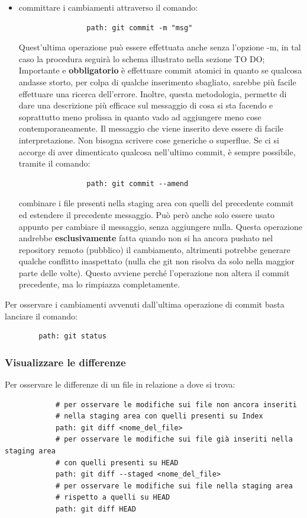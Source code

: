 \begin{itemize}
			\item committare i cambiamenti attraverso il comando:
				\begin{verbatim}
				path: git commit -m "msg"
				\end{verbatim}
				\noindent
				Quest'ultima operazione può essere effettuata anche senza l'opzione -m, in tal caso la procedura seguirà lo schema illustrato nella sezione TO DO; \newline
				Importante e \textbf{obbligatorio} è effettuare commit atomici in quanto se qualcosa andasse storto, per colpa di qualche inserimento sbagliato, sarebbe più facile effettuare una ricerca dell'errore. Inoltre, questa metodologia, permette di dare una descrizione più efficace sul messaggio di cosa si sta facendo e soprattutto meno prolissa in quanto vado ad aggiungere meno cose contemporaneamente. \newline
				Il messaggio che viene inserito deve essere di facile interpretazione. Non bisogna scrivere cose generiche o superflue. \newline
				Se ci si accorge di aver dimenticato qualcosa nell'ultimo commit, è sempre possibile, tramite il comando:
				\begin{verbatim}
				path: git commit --amend
				\end{verbatim}
				combinare i file presenti nella staging area con quelli del precedente commit ed estendere il precedente messaggio. Può però anche solo essere usato appunto per cambiare il messaggio, senza aggiungere nulla.\newline
				Questa operazione andrebbe \textbf{esclusivamente} fatta quando non si ha ancora pushato nel repository remoto (pubblico) il cambiamento, altrimenti potrebbe generare qualche conflitto inaspettato (nulla che git non risolva da solo nella maggior parte delle volte). Questo avviene perché l'operazione non altera il commit precedente, ma lo rimpiazza completamente.

		\end{itemize}
	\noindent
	Per osservare i cambiamenti avvenuti dall'ultima operazione di commit basta lanciare il comando:
		\begin{verbatim}
		path: git status
		\end{verbatim}

	
		\subsubsection{Visualizzare le differenze} %
		\label{ssub:visualizzare_le_differenze}
		Per osservare le differenze di un file in relazione a dove si trova:
			\begin{verbatim}
			# per osservare le modifiche sui file non ancora inseriti
			# nella staging area con quelli presenti su Index
			path: git diff <nome_del_file>
			# per osservare le modifiche sui file già inseriti nella staging area
			# con quelli presenti su HEAD
			path: git diff --staged <nome_del_file>
			# per osservare le modifiche sui file nella staging area
			# rispetto a quelli su HEAD
			path: git diff HEAD
			\end{verbatim}


